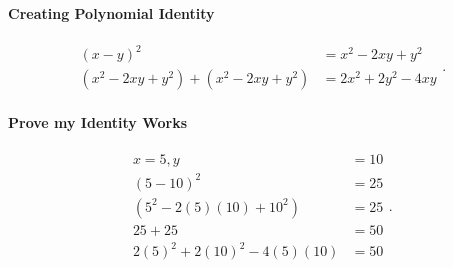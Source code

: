 \paragraph{Creating Polynomial Identity}

\begin{equation}
  \begin{split}
    (x - y)^2   &= x^2 - 2xy + y^2 \\
    (x^2 - 2xy + y^2) + (x^2 - 2xy + y^2) &= \boxed{2x^2 + 2y^2 - 4xy}
  \end{split}
.\end{equation}

\paragraph{Prove my Identity Works}

\begin{equation}
  \begin{split}
    x = 5, y &= 10 \\   
    (5 - 10)^2 &= 25 \\
    (5^2 - 2(5)(10) + 10^2) &= 25 \\
    25 + 25 &= \boxed{50} \\
    2(5)^2 + 2(10)^2 - 4(5)(10) &= \boxed{50}
  \end{split}
.\end{equation}
